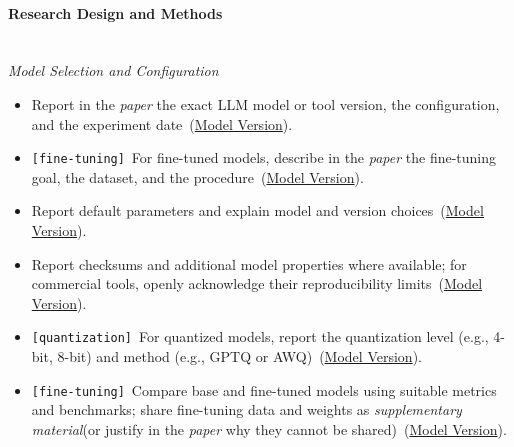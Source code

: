 \documentclass[smallextended]{svjour3}
\makeatletter
\newcommand{\must}{\textbf{must}\xspace}
\newcommand{\should}{\textbf{should}\xspace}
\newcommand{\paper}{\emph{paper}\xspace}
\newcommand{\supplementarymaterial}{\emph{supplementary material}\xspace}
\newcommand{\paper}{\emph{paper}\xspace}
\newcommand{\supplementarymaterial}{\emph{supplementary material}\xspace}
\newcommand{\iconM}{\usebox{\iconMbox}\xspace}
\newcommand{\iconS}{\usebox{\iconSbox}\xspace}
\newcommand{\iconM}{●\xspace}
\newcommand{\iconS}{○\xspace}
\newcommand{\condition}[1]{\texttt{\small[#1]}\,}
\newcommand{\condition}[1]{@@cond:#1@@}
\newcommand{\refmodelversion}{\hyperref[sec:report-model-version-configuration-and-customizations]{Model Version}}
\newcommand{\refmodelversion}{\href{/guidelines/report-model-version-configuration-and-customizations/}{Model Version}}
\makeatother
\begin{document}
\begin{appendices}
\paragraph{\textbf{Research Design and Methods}}\mbox{}\\
\noindent\textit{Model Selection and Configuration}
\begin{itemize}[label={},leftmargin=*]
    \item \iconM Report in the \paper the exact LLM model or tool version, the configuration, and the experiment date~(\refmodelversion).
    \item \iconM \condition{fine-tuning} For fine-tuned models, describe in the \paper the fine-tuning goal, the dataset, and the procedure~(\refmodelversion).
    \item \iconS Report default parameters and explain model and version choices~(\refmodelversion).
    \item \iconS Report checksums and additional model properties where available; for commercial tools, openly acknowledge their reproducibility limits~(\refmodelversion).
    \item \iconS \condition{quantization} For quantized models, report the quantization level (e.g., 4-bit, 8-bit) and method (e.g., GPTQ or AWQ)~(\refmodelversion).
    \item \iconS \condition{fine-tuning} Compare base and fine-tuned models using suitable metrics and benchmarks; share fine-tuning data and weights as \supplementarymaterial (or justify in the \paper why they cannot be shared)~(\refmodelversion).

\end{itemize}
\end{appendices}
\end{document}

